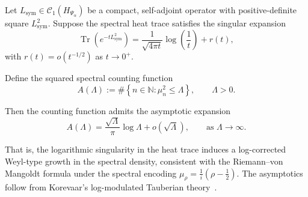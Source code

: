 \begin{lemma}
\label{lem:tauberian-log-correction}
Let \( L_{\mathrm{sym}} \in \mathcal{C}_1(H_{\Psi_\alpha}) \) be a compact, self-adjoint operator with positive-definite square \( L_{\mathrm{sym}}^2 \). Suppose the spectral heat trace satisfies the singular expansion
\[
\operatorname{Tr}(e^{-t L_{\mathrm{sym}}^2}) = \frac{1}{\sqrt{4\pi t}} \log\left( \frac{1}{t} \right) + r(t),
\]
with \( r(t) = o(t^{-1/2}) \) as \( t \to 0^+ \).

Define the squared spectral counting function
\[
A(\Lambda) := \#\left\{ n \in \mathbb{N} : \mu_n^2 \le \Lambda \right\}, \qquad \Lambda > 0.
\]

Then the counting function admits the asymptotic expansion
\[
A(\Lambda) = \frac{\sqrt{\Lambda}}{\pi} \log \Lambda + o(\sqrt{\Lambda}), \qquad \text{as } \Lambda \to \infty.
\]

\medskip
\noindent
That is, the logarithmic singularity in the heat trace induces a log-corrected Weyl-type growth in the spectral density, consistent with the Riemann–von Mangoldt formula under the spectral encoding \( \mu_\rho = \frac{1}{i}(\rho - \frac{1}{2}) \). The asymptotics follow from Korevaar’s log-modulated Tauberian theory~\cite[Ch.~III, §5]{Korevaar2004Tauberian}.
\end{lemma}
